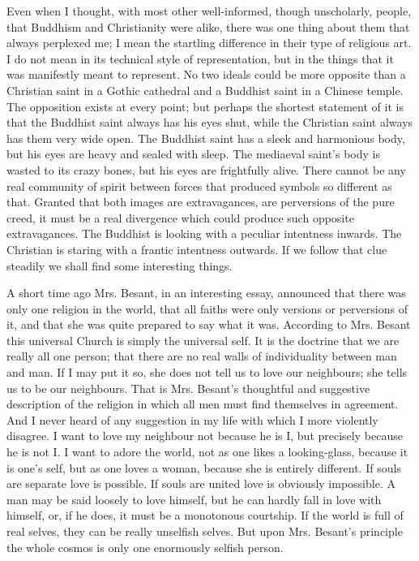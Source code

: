 Even when I thought, with most other well-informed, though unscholarly, people, that Buddhism and Christianity were alike, there was one thing about them that always perplexed me; I mean the startling difference in their type of religious art. I do not mean in its technical style of representation, but in the things that it was manifestly meant to represent. No two ideals could be more opposite than a Christian saint in a Gothic cathedral and a Buddhist saint in a Chinese temple. The opposition exists at every point; but perhaps the shortest statement of it is that the Buddhist saint always has his eyes shut, while the Christian saint always has them very wide open. The Buddhist saint has a sleek and harmonious body, but his eyes are heavy and sealed with sleep. The mediaeval saint’s body is wasted to its crazy bones, but his eyes are frightfully alive. There cannot be any real community of spirit between forces that produced symbols so different as that. Granted that both images are extravagances, are perversions of the pure creed, it must be a real divergence which could produce such opposite extravagances. The Buddhist is looking with a peculiar intentness inwards. The Christian is staring with a frantic intentness outwards. If we follow that clue steadily we shall find some interesting things.

A short time ago Mrs. Besant, in an interesting essay, announced that there was only one religion in the world, that all faiths were only versions or perversions of it, and that she was quite prepared to say what it was. According to Mrs. Besant this universal Church is simply the universal self. It is the doctrine that we are really all one person; that there are no real walls of individuality between man and man. If I may put it so, she does not tell us to love our neighbours; she tells us to be our neighbours. That is Mrs. Besant’s thoughtful and suggestive description of the religion in which all men must find themselves in agreement. And I never heard of any suggestion in my life with which I more violently disagree. I want to love my neighbour not because he is I, but precisely because he is not I. I want to adore the world, not as one likes a looking-glass, because it is one’s self, but as one loves a woman, because she is entirely different. If souls are separate love is possible. If souls are united love is obviously impossible. A man may be said loosely to love himself, but he can hardly fall in love with himself, or, if he does, it must be a monotonous courtship. If the world is full of real selves, they can be really unselfish selves. But upon Mrs. Besant’s principle the whole cosmos is only one enormously selfish person.

